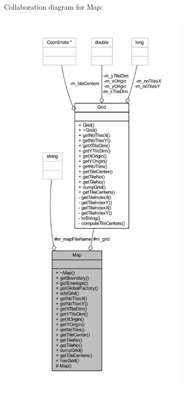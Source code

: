 Collaboration diagram for Map\+:\nopagebreak
\begin{figure}[H]
\begin{center}
\leavevmode
\includegraphics[height=550pt]{class_map__coll__graph}
\end{center}
\end{figure}
